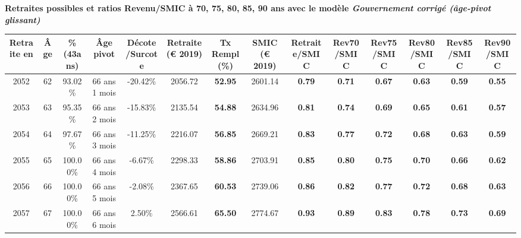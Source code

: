  \vspace{0.1cm} 
{\bf \noindent Retraites possibles et ratios Revenu/SMIC à 70, 75, 80, 85, 90 ans avec le modèle \emph{Gouvernement corrigé (âge-pivot glissant)}}  
 
\begin{adjustbox}{max width=\textwidth} 
\begin{tabular}[htb]{|c|c||c|c|c||c|c||c||c|c|c|c|c|c|} 
\hline 
 Retraite en &  Âge &  \%(43ans) &  Âge pivot &  Décote/Surcote &  Retraite (\euro{} 2019) &  Tx Rempl(\%) &  SMIC (\euro{} 2019) &  Retraite/SMIC &  Rev70/SMIC &  Rev75/SMIC &  Rev80/SMIC &  Rev85/SMIC &  Rev90/SMIC \\ 
\hline \hline 
 2052 &  62 &  93.02\% &  66 ans 1 mois &  -20.42\% &  2056.72 &  {\bf 52.95} &  2601.14 &  {\bf {\color{red} 0.79}} &  {\bf {\color{red} 0.71}} &  {\bf {\color{red} 0.67}} &  {\bf {\color{red} 0.63}} &  {\bf {\color{red} 0.59}} &  {\bf {\color{red} 0.55}} \\ 
\hline 
 2053 &  63 &  95.35\% &  66 ans 2 mois &  -15.83\% &  2135.54 &  {\bf 54.88} &  2634.96 &  {\bf {\color{red} 0.81}} &  {\bf {\color{red} 0.74}} &  {\bf {\color{red} 0.69}} &  {\bf {\color{red} 0.65}} &  {\bf {\color{red} 0.61}} &  {\bf {\color{red} 0.57}} \\ 
\hline 
 2054 &  64 &  97.67\% &  66 ans 3 mois &  -11.25\% &  2216.07 &  {\bf 56.85} &  2669.21 &  {\bf {\color{red} 0.83}} &  {\bf {\color{red} 0.77}} &  {\bf {\color{red} 0.72}} &  {\bf {\color{red} 0.68}} &  {\bf {\color{red} 0.63}} &  {\bf {\color{red} 0.59}} \\ 
\hline 
 2055 &  65 &  100.00\% &  66 ans 4 mois &  -6.67\% &  2298.33 &  {\bf 58.86} &  2703.91 &  {\bf {\color{red} 0.85}} &  {\bf {\color{red} 0.80}} &  {\bf {\color{red} 0.75}} &  {\bf {\color{red} 0.70}} &  {\bf {\color{red} 0.66}} &  {\bf {\color{red} 0.62}} \\ 
\hline 
 2056 &  66 &  100.00\% &  66 ans 5 mois &  -2.08\% &  2367.65 &  {\bf 60.53} &  2739.06 &  {\bf {\color{red} 0.86}} &  {\bf {\color{red} 0.82}} &  {\bf {\color{red} 0.77}} &  {\bf {\color{red} 0.72}} &  {\bf {\color{red} 0.68}} &  {\bf {\color{red} 0.63}} \\ 
\hline 
 2057 &  67 &  100.00\% &  66 ans 6 mois &  2.50\% &  2566.61 &  {\bf 65.50} &  2774.67 &  {\bf {\color{red} 0.93}} &  {\bf {\color{red} 0.89}} &  {\bf {\color{red} 0.83}} &  {\bf {\color{red} 0.78}} &  {\bf {\color{red} 0.73}} &  {\bf {\color{red} 0.69}} \\ 
\hline 
\hline 
\end{tabular} 
\end{adjustbox} 
 
